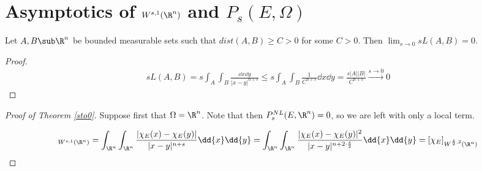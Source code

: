 \documentclass[../main.tex]{subfiles}
\begin{document}
\section{Asymptotics of $ W^{s,1}(\R^{n}) $ and $ P_{s}(E,\Omega) $}

\begin{lemma}
    Let $ A, B\sub \R^{n} $ be bounded measurable sets such that $ dist(A,B)\geq C > 0  $ for some $ C>0 $. Then $ \lim_{s\to0} sL(A,B) = 0 $.
\end{lemma}

\begin{proof}
    \begin{align*}
        sL(A,B) = s\int_{A}\int_{B} \frac{\dd{x}\dd{y}}{|x-y|^{n+s}} \leq s\int_{A} \int_{B} \frac{1}{C^{n+s}}\dd{x}\dd{y} = \frac{s |A| |B|}{C^{n+s}} \xrightarrow{s\to0} 0
    \end{align*}
\end{proof}

\begin{proof}[Proof of Theorem \ref{sto0}]
    Suppose first that $ \Omega = \R^{n} $. Note that then $ P_{s}^{NL}(E,\R^{n}) = 0 $, so we are left with only a local term.

    \begin{align*}
        [\chi_{E}]_{W^{s,1}(\R^{n})} = \int_{\R^{n}} \int_{\R^{n}} \frac{| \chi_{E}(x) - \chi_{E}(y)|}{|x-y|^{n+s}} \dd{x}\dd{y} = \int_{\R^{n}} \int_{\R^{n}} \frac{| \chi_{E}(x) - \chi_{E}(y)|^{2}}{|x-y|^{n+2\cdot\frac{s}{2}}} \dd{x}\dd{y} = [ \chi_{E} ]_{W^{\frac{s}{2},2}(\R^{n})} 
    \end{align*}
    
\end{proof}
\end{document}
